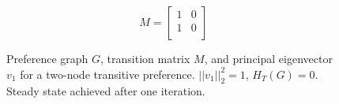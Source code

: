 \begin{figure}[!htb] %
\centering
\begin{minipage}{1.2in}
\end{minipage}
\hfill
\begin{minipage}{1.2in}
\[
M=
  \begin{bmatrix}
    1 & 0 \\
    1 & 0 \\
  \end{bmatrix}
\]
\end{minipage}
\hfill
\begin{minipage}{1.2in}
\end{minipage}
\caption{Preference graph $G$, transition matrix $M$, and principal eigenvector $v_1$ for a two-node transitive preference. $||v_1||_2^2 = 1$, $H_T(G) = 0$. Steady state achieved after one iteration.}
\label{fig:linalg_1} 
\end{figure}



